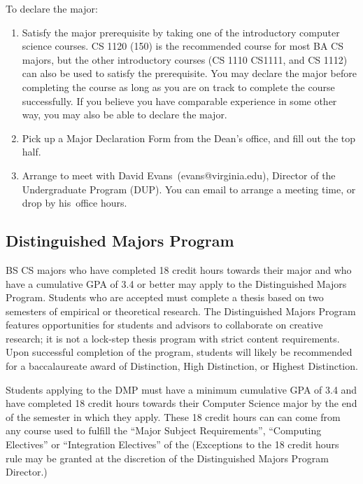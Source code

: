 \documentclass[10pt,letter]{book}
\makeatletter
\newenvironment{numlist}{
\begin{enumerate}
\setlength{\itemsep}{0pt}
\setlength{\parskip}{0pt}}
{\end{enumerate}}
\newcommand{\badup}{David Evans}
\newcommand{\badupemail}{evans@virginia.edu}
\newcommand{\baduppronoun}{his\ } %
\makeatother
\begin{document}
To declare the major:

\begin{numlist}

\item Satisfy the major prerequisite by taking one of the introductory
  computer science courses. CS 1120 (150) is the recommended course
  for most BA CS majors, but the other introductory courses (CS 1110
  CS1111, and CS 1112) can also be used to satisfy the
  prerequisite. You may declare the major before completing the course
  as long as you are on track to complete the course successfully. If
  you believe you have comparable experience in some other way, you
  may also be able to declare the major.

\item Pick up a Major Declaration Form from the Dean's office, and
  fill out the top half.

\item Arrange to meet with \badup\ (\badupemail), Director of the
  Undergraduate Program (DUP). You can email to arrange a meeting
  time, or drop by \baduppronoun office hours.

\end{numlist}


\subsection{Distinguished Majors Program}


BS CS
%
majors who have completed 18 credit hours towards their major and who
have a cumulative GPA of 3.4 or better may apply to the Distinguished
Majors Program. Students who are accepted must complete a thesis based
on two semesters of empirical or theoretical research. The
Distinguished Majors Program features opportunities for students and
advisors to collaborate on creative research; it is not a lock-step
thesis program with strict content requirements. Upon successful
completion of the program, students will likely be recommended for a
baccalaureate award of Distinction, High Distinction, or Highest
Distinction.

Students applying to the DMP must have a minimum cumulative GPA of 3.4
and have completed 18 credit hours towards their Computer Science
major by the end of the semester in which they apply. These 18 credit
hours can can come from any course used to fulfill the ``Major Subject
Requirements'', ``Computing Electives'' or ``Integration Electives''
of the 
(Exceptions to the 18 credit hours rule may be granted at the
discretion of the Distinguished Majors Program Director.)
\end{document}
